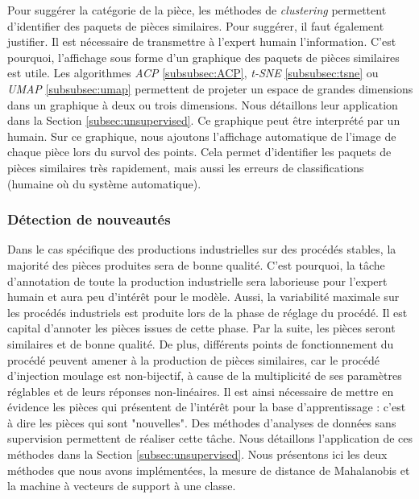 Pour suggérer la catégorie de la pièce, les méthodes de \textit{clustering} permettent d'identifier des paquets de pièces similaires.
Pour suggérer, il faut également justifier.
Il est nécessaire de transmettre à l'expert humain l'information.
C'est pourquoi, l'affichage sous forme d'un graphique des paquets de pièces similaires est utile.
Les algorithmes \textit{ACP} \ref{subsubsec:ACP}, \textit{t-SNE} \ref{subsubsec:tsne} ou \textit{UMAP} \ref{subsubsec:umap} permettent de projeter un espace de grandes dimensions dans un graphique à deux ou trois dimensions.
Nous détaillons leur application dans la Section \ref{subsec:unsupervised}.
Ce graphique peut être interprété par un humain.
Sur ce graphique, nous ajoutons l'affichage automatique de l'image de chaque pièce lors du survol des points.
Cela permet d'identifier les paquets de pièces similaires très rapidement, mais aussi les erreurs de classifications (humaine où du système automatique).


\subsubsection{Détection de nouveautés}
Dans le cas spécifique des productions industrielles sur des procédés stables, la majorité des pièces produites sera de bonne qualité.
C'est pourquoi, la tâche d'annotation de toute la production industrielle sera laborieuse pour l'expert humain et aura peu d'intérêt pour le modèle.
Aussi, la variabilité maximale sur les procédés industriels est produite lors de la phase de réglage du procédé.
Il est capital d'annoter les pièces issues de cette phase.
Par la suite, les pièces seront similaires et de bonne qualité.
De plus, différents points de fonctionnement du procédé peuvent amener à la production de pièces similaires, car le procédé d'injection moulage est non-bijectif, à cause de la multiplicité de ses paramètres réglables et de leurs réponses non-linéaires.
Il est ainsi nécessaire de mettre en évidence les pièces qui présentent de l'intérêt pour la base d'apprentissage : c'est à dire les pièces qui sont "nouvelles".
Des méthodes d'analyses de données sans supervision permettent de réaliser cette tâche.
Nous détaillons l'application de ces méthodes dans la Section \ref{subsec:unsupervised}.
Nous présentons ici les deux méthodes que nous avons implémentées, la mesure de distance de Mahalanobis et la machine à vecteurs de support à une classe.

